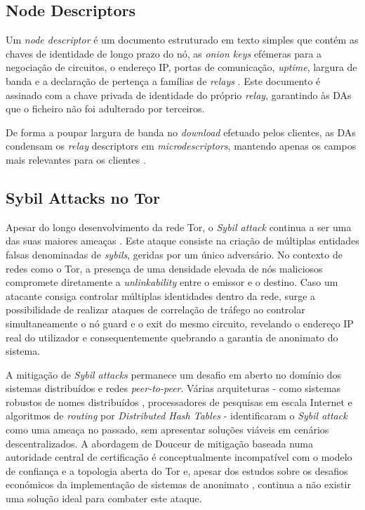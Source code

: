 \subsection{Node Descriptors}

Um \textit{node descriptor} é um documento estruturado em texto simples que contém as chaves de identidade de longo prazo do nó, as \textit{onion keys} efémeras para a negociação de circuitos, o endereço IP, portas de comunicação, \textit{uptime}, largura de banda e a declaração de pertença a famílias de \textit{relays} \cite{tor_dirspec_serverdesc}. Este documento é assinado com a chave privada de identidade do próprio \textit{relay}, garantindo às DAs que o ficheiro não foi adulterado por terceiros.

De forma a poupar largura de banda no \textit{download} efetuado pelos clientes, as DAs condensam os \textit{relay} descriptors em \textit{microdescriptors}, mantendo apenas os campos mais relevantes para os clientes \cite{tor_dirspec_microdesc}.

\subsection{Sybil Attacks no Tor}

Apesar do longo desenvolvimento da rede Tor, o \textit{Sybil attack} continua a ser uma das suas maiores ameaças \cite{douceur2002sybil}. Este ataque consiste na criação de múltiplas entidades falsas denominadas de \textit{sybils}, geridas por um único adversário. No contexto de redes como o Tor, a presença de uma densidade elevada de nós maliciosos compromete diretamente a \textit{unlinkability} entre o emissor e o destino. Caso um atacante consiga controlar múltiplas identidades dentro da rede, surge a possibilidade de realizar ataques de correlação de tráfego ao controlar simultaneamente o nó guard e o exit do mesmo circuito, revelando o endereço IP real do utilizador e consequentemente quebrando a garantia de anonimato do sistema.

A mitigação de \textit{Sybil attacks} permanece um desafio em aberto no domínio dos sistemas distribuídos e redes \textit{peer-to-peer}. Várias arquiteturas \cite{cvrcek2004role, dingledine2004synchronous, serjantov2004dealing, shneidman2004faithfulness} - como sistemas robustos de nomes distribuídos \cite{awerbuch2004robust}, processadores de pesquisas em escala Internet \cite{huebsch2005architecture} e algoritmos de \textit{routing} por \textit{Distributed Hash Tables} \cite{marti2004sprout} - identificaram o \textit{Sybil attack} como uma ameaça no passado, sem apresentar soluções viáveis em cenários descentralizados. A abordagem de Douceur de mitigação baseada numa autoridade central de certificação \cite{douceur2002sybil} é conceptualmente incompatível com o modelo de confiança e a topologia aberta do Tor e, apesar dos estudos sobre os desafios económicos da implementação de sistemas de anonimato \cite{acquisti2003economics}, continua a não existir uma solução ideal para combater este ataque.

